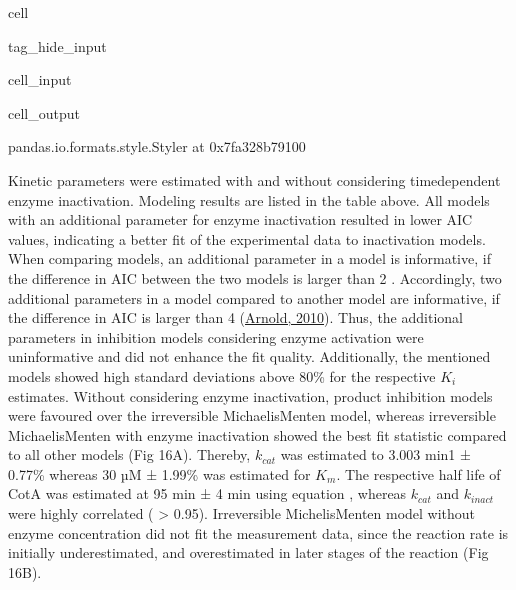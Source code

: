 \documentclass[letterpaper,12pt,english]{jupyterBook}
\begin{document}
\begin{sphinxuseclass}{cell}
\begin{sphinxuseclass}{tag_hide_input}
\begin{sphinxVerbatimInput}
\begin{sphinxuseclass}{cell_input}
\end{sphinxuseclass}\end{sphinxVerbatimInput}
\begin{sphinxVerbatimOutput}

\begin{sphinxuseclass}{cell_output}
\begin{sphinxVerbatim}[commandchars=\\\{\}]
\PYGZlt{}pandas.io.formats.style.Styler at 0x7fa328b79100\PYGZgt{}
\end{sphinxVerbatim}

\end{sphinxuseclass}\end{sphinxVerbatimOutput}

\end{sphinxuseclass}
\end{sphinxuseclass}
\sphinxAtStartPar
Kinetic parameters were estimated with and without considering time\sphinxhyphen{}dependent enzyme inactivation.
Modeling results are listed in the table above.
All models with an additional parameter for enzyme inactivation resulted in lower AIC values, indicating a better fit of the experimental data to inactivation models. When comparing models, an additional parameter in a model is informative, if the difference in AIC between the two models is larger than 2 . Accordingly, two additional parameters in a model compared to another model are informative, if the difference in AIC is larger than 4 (\hyperlink{cite.references:id16}{Arnold, 2010}). Thus, the additional parameters in inhibition models considering enzyme activation were uninformative and did not enhance the fit quality. Additionally, the mentioned models showed high standard deviations above 80\% for the respective \(K_{i}\) estimates.
Without considering enzyme inactivation, product inhibition models were favoured over the irreversible Michaelis\sphinxhyphen{}Menten model,
whereas irreversible Michaelis\sphinxhyphen{}Menten with enzyme inactivation showed the best fit statistic compared to all other models (Fig 16A). Thereby, \(k_{cat}\) was estimated to 3.003 min\sphinxhyphen{}1 ± 0.77\% whereas 30 µM ± 1.99\%  was estimated for \(K_{m}\). The respective half life of CotA was estimated at 95 min ± 4 min using equation {\hyperref[\detokenize{scenarios/SLAC_kinetic_characterization:equation-enzyme-halflife}]{}}, whereas \(k_{cat}\) and \(k_{inact}\) were highly correlated ( > 0.95). Irreversible Michelis\sphinxhyphen{}Menten model without enzyme concentration did not fit the measurement data, since the reaction rate is initially underestimated, and overestimated in later stages of the reaction (Fig 16B).
\end{document}
